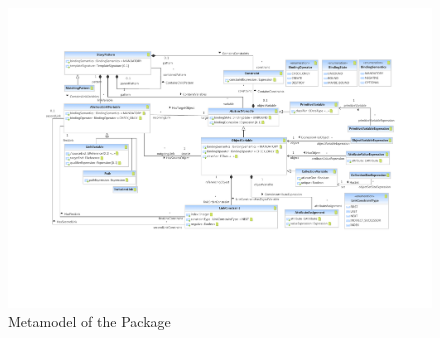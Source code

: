 %
%

\begin{figure}[htbp]
  \centering
  \includegraphics[width=\textheight,angle=90]{figures/A_technical-reference/packages/storydiagrams_patterns/storydiagrams-patterns}
  \caption{Metamodel of the  Package}
  \label{fig:MM:patterns}
\end{figure}

